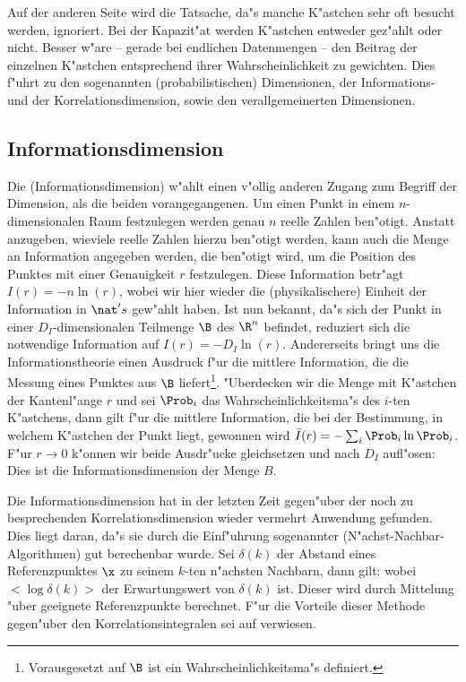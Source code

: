 Auf der anderen Seite wird die Tatsache, da"s manche K"astchen sehr oft besucht werden,
ignoriert.  Bei der Kapazit"at werden K"astchen entweder gez"ahlt oder nicht. Besser w"are
-- gerade bei endlichen Datenmengen -- den Beitrag der einzelnen K"astchen entsprechend
ihrer Wahrscheinlichkeit zu gewichten. Dies f"uhrt zu den sogenannten
\begriff(probabilistischen) Dimensionen, der Informations- und der Korrelationsdimension,
sowie den verallgemeinerten Dimensionen.



\subsection{Informationsdimension}
Die \begriff(Informationsdimension) w"ahlt einen v"ollig anderen Zugang zum Begriff der Dimension,
als die beiden vorangegangenen. Um einen Punkt in einem $n$-dimensionalen Raum festzulegen 
werden genau $n$ reelle Zahlen ben"otigt. Anstatt anzugeben, wieviele reelle Zahlen
hierzu ben"otigt werden, kann auch die Menge an Information angegeben
werden, die ben"otigt wird, um die Position des Punktes mit einer Genauigkeit $r$
festzulegen. Diese Information betr"agt $I(r)=-n\ln(r)$, wobei wir hier wieder die
\naja(physikalischere) Einheit der Information in $\nat's$ gew"ahlt haben. Ist nun bekannt, da"s
sich der Punkt in einer $D_I$-dimensionalen Teilmenge $\B$ des $\R^n$ befindet, reduziert 
sich die notwendige Information auf $I(r)=-D_I\ln(r)$. Andererseits bringt uns die 
Informationstheorie einen Ausdruck f"ur die mittlere Information, die die Messung eines
Punktes aus $\B$ liefert\footnote{Vorausgesetzt auf $\B$ ist ein Wahrscheinlichkeitsma"s
definiert.}. "Uberdecken wir die Menge mit K"astchen der Kantenl"ange $r$ und sei $\Prob_i$ 
das Wahrscheinlichkeitsma"s des $i$-ten K"astchens, dann gilt f"ur die mittlere
Information, die bei der Bestimmung, in welchem K"astchen der Punkt liegt, gewonnen wird $\bar I(r)=-\sum_i
\Prob_i\ln \Prob_i$. F"ur 
$r\to 0$ k"onnen wir beide Ausdr"ucke gleichsetzen und nach $D_I$ aufl"osen:
Dies ist die Informationsdimension der Menge $B$. 

Die Informationsdimension hat in der
letzten Zeit gegen"uber der noch zu besprechenden Korrelationsdimension wieder vermehrt
Anwendung gefunden. Dies liegt daran, da"s sie durch die Einf"uhrung  sogenannter
\begriff(N"achst-Nachbar-Algorithmen) gut berechenbar wurde\cite{Badii85}. Sei
$\delta(k)$ der Abstand eines Referenzpunktes $\x$ zu seinem $k$-ten n"achsten Nachbarn, dann
gilt:
wobei $<\log \delta(k)>$ der Erwartungswert von $\delta(k)$ ist. Dieser wird durch
Mittelung "uber geeignete Referenzpunkte berechnet. F"ur die Vorteile dieser Methode
gegen"uber den Korrelationsintegralen sei auf \cite{Liebert91} verwiesen.



